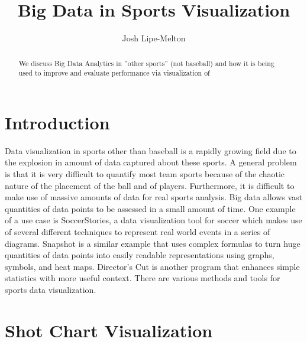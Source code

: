 \documentclass[sigconf]{acmart}
\begin{document}
\title{Big Data in Sports Visualization}


\author{Josh Lipe-Melton}

\renewcommand{\shortauthors}{J. Lipe-Melton}


\begin{abstract}
We discuss Big Data Analytics in ''other sports'' (not baseball) and how it is being used to improve and evaluate performance via visualization of 
\end{abstract}



\maketitle




\section{Introduction} 

Data visualization in sports other than baseball is a rapidly growing field due to the explosion in amount of data captured about these sports. A general problem is that it is very difficult to quantify most team sports because of the chaotic nature of the placement of the ball and of players. Furthermore, it is difficult to make use of massive amounts of data for real sports analysis. Big data allows vast quantities of data points to be assessed in a small amount of time. One example of a use case is SoccerStories, a data visualization tool for soccer which makes use of several different techniques to represent real world events in a series of diagrams. Snapshot is a similar example that uses complex formulas to turn huge quantities of data points into easily readable representations using graphs, symbols, and heat maps. Director’s Cut is another program that enhances simple statistics with more useful context. There are various methods and tools for sports data visualization.

\section{Shot Chart Visualization}
\end{document}
